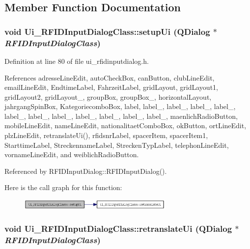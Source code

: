 \subsection{Member Function Documentation}
\hypertarget{class_ui___r_f_i_d_input_dialog_class_7b24e54527465a18688667456e5d3b6b}{
\subsubsection[setupUi]{\setlength{\rightskip}{0pt plus 5cm}void Ui\_\-RFIDInputDialogClass::setupUi (QDialog $\ast$ {\em RFIDInputDialogClass})}}
\label{class_ui___r_f_i_d_input_dialog_class_7b24e54527465a18688667456e5d3b6b}




Definition at line 80 of file ui\_\-rfidinputdialog.h.

References adresseLineEdit, autoCheckBox, canButton, clubLineEdit, emailLineEdit, EndtimeLabel, FahrzeitLabel, gridLayout, gridLayout1, gridLayout2, gridLayout\_, groupBox, groupBox\_, horizontalLayout, jahrgangSpinBox, KategoriecomboBox, label, label\_, label\_, label\_, label\_, label\_, label\_, label\_, label\_, label\_, label\_, label\_, maenlichRadioButton, mobileLineEdit, nameLineEdit, nationalitaetComboBox, okButton, ortLineEdit, plzLineEdit, retranslateUi(), rfidsnrLabel, spacerItem, spacerItem1, StarttimeLabel, StreckennameLabel, StreckenTypLabel, telephonLineEdit, vornameLineEdit, and weiblichRadioButton.

Referenced by RFIDInputDialog::RFIDInputDialog().

Here is the call graph for this function:\nopagebreak
\begin{figure}[H]
\begin{center}
\leavevmode
\includegraphics[width=215pt]{class_ui___r_f_i_d_input_dialog_class_7b24e54527465a18688667456e5d3b6b_cgraph}
\end{center}
\end{figure}
\hypertarget{class_ui___r_f_i_d_input_dialog_class_c8e694a988ce7c5c1b2d05e2f0ff819c}{
\subsubsection[retranslateUi]{\setlength{\rightskip}{0pt plus 5cm}void Ui\_\-RFIDInputDialogClass::retranslateUi (QDialog $\ast$ {\em RFIDInputDialogClass})}}
\label{class_ui___r_f_i_d_input_dialog_class_c8e694a988ce7c5c1b2d05e2f0ff819c}




